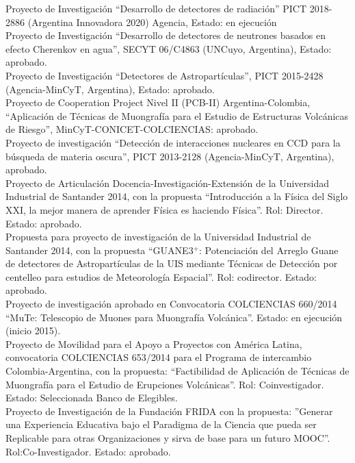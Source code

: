  Proyecto de Investigación ``Desarrollo de detectores de radiación'' PICT 2018-2886 (Argentina Innovadora 2020) Agencia, Estado: en ejecución\\
 Proyecto de Investigación ``Desarrollo de detectores de neutrones basados en efecto Cherenkov en agua'', SECYT 06/C4863 (UNCuyo, Argentina), Estado: aprobado.\\
 Proyecto de Investigación ``Detectores de Astropartículas'', PICT 2015-2428 (Agencia-MinCyT, Argentina), Estado: aprobado.\\
\ifres
\else
{} Proyecto de Cooperation Project Nivel II (PCB-II) Argentina-Colombia, ``Aplicación de Técnicas de Muongrafía para el Estudio de Estructuras Volcánicas de Riesgo'', MinCyT-CONICET-COLCIENCIAS: aprobado.\\
 Proyecto de investigación ``Detección de interacciones nucleares en CCD para la búsqueda de materia oscura'', PICT 2013-2128 (Agencia-MinCyT, Argentina), aprobado.\\
 Proyecto de Articulación Docencia-Investigación-Extensión de la Universidad Industrial de Santander 2014, con la propuesta ``Introducción a la Física del Siglo XXI, la mejor manera de aprender Física es haciendo Física''. Rol: Director. Estado: aprobado.\\
 Propuesta para proyecto de investigación de la Universidad Industrial de Santander 2014, con la propuesta ``GUANE3$^+$: Potenciación del Arreglo Guane de detectores de Astropartículas de la UIS mediante Técnicas de Detección por centelleo para estudios de Meteorología Espacial''. Rol: codirector. Estado: aprobado.\\
 Proyecto de investigación aprobado en Convocatoria COLCIENCIAS 660/2014 ``MuTe: Telescopio de Muones para Muongrafía Volcánica''. Estado: en ejecución (inicio 2015).\\
 Proyecto de Movilidad para el Apoyo a Proyectos con América Latina, convocatoria COLCIENCIAS 653/2014 para el Programa de intercambio Colombia-Argentina, con la propuesta: ``Factibilidad de Aplicación de Técnicas de Muongrafía para el Estudio de Erupciones Volcánicas''. Rol: Coinvestigador. Estado: Seleccionada Banco de Elegibles.\\
 Proyecto de Investigación de la Fundación FRIDA con la propuesta: ''Generar una Experiencia Educativa bajo el Paradigma de la Ciencia que pueda ser Replicable para otras Organizaciones y sirva de base para un futuro MOOC''. Rol:Co-Investigador. Estado: aprobado.\\
